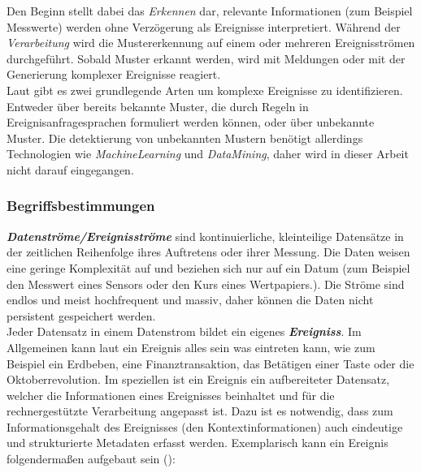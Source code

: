 \documentclass{acm_proc_article-sp}
\begin{document}
Den Beginn stellt dabei das \emph{Erkennen} dar, relevante Informationen (zum Beispiel 
Messwerte) werden ohne Verzögerung als Ereignisse interpretiert. Während der 
\emph{Verarbeitung} wird die Mustererkennung auf einem oder mehreren Ereignisströmen 
durchgeführt. Sobald Muster erkannt werden, wird mit Meldungen oder mit 
der Generierung komplexer Ereignisse reagiert.\\
Laut \cite{eckert} gibt es zwei grundlegende Arten um 
komplexe Ereignisse zu identifizieren. Entweder über bereits bekannte Muster, die durch 
Regeln in Ereignisanfragesprachen formuliert werden können, oder über unbekannte Muster. 
Die detektierung von unbekannten Mustern benötigt allerdings Technologien wie 
\textit{MachineLearning} und \textit{DataMining}, daher wird in dieser Arbeit nicht 
darauf eingegangen.

\subsubsection{Begriffsbestimmungen}\label{begriffsbestimmung}
\vspace{0.1cm}
\textbf{\textit{Datenströme/Ereignisströme}}
sind kontinuierliche, kleinteilige Datensätze in der 
zeitlichen Reihenfolge ihres Auftretens oder ihrer Messung. Die Daten weisen eine geringe 
Komplexität auf und beziehen sich nur auf ein Datum (zum Beispiel den Messwert eines 
Sensors oder den Kurs eines Wertpapiers.). Die Ströme sind endlos und meist 
hochfrequent und massiv, daher können die Daten nicht persistent gespeichert werden.\\
Jeder Datensatz in einem Datenstrom bildet ein eigenes 
\textbf{\textit{Ereigniss}}. Im 
Allgemeinen kann laut \cite{glossary} ein Ereignis alles sein was eintreten kann, wie zum 
Beispiel ein Erdbeben, eine Finanztransaktion, das Betätigen einer Taste oder die 
Oktoberrevolution. Im speziellen ist ein Ereignis ein aufbereiteter Datensatz, welcher 
die Informationen eines Ereignisses beinhaltet und für die rechnergestützte Verarbeitung 
angepasst ist. Dazu ist es notwendig, dass zum Informationsgehalt des Ereignisses (den 
Kontextinformationen) auch eindeutige und strukturierte Metadaten erfasst werden. 
Exemplarisch 
kann ein Ereignis folgendermaßen aufgebaut sein (\cite{hedtstuck}):
\end{document}
